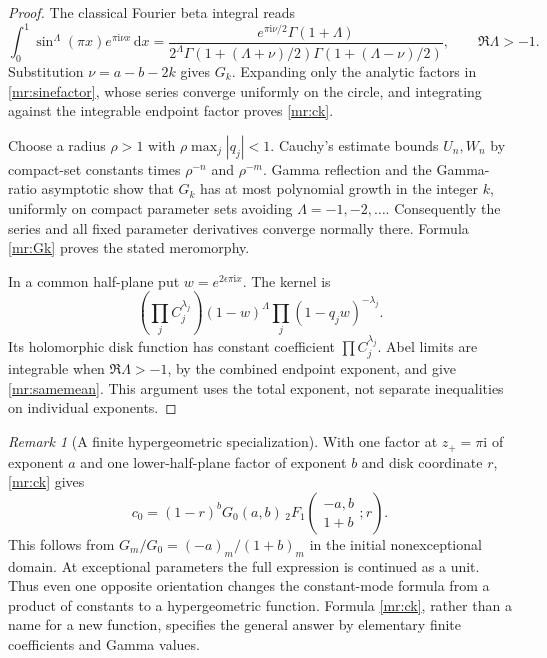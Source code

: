 \documentclass[11pt]{article}
\numberwithin{equation}{section}
\theoremstyle{plain}
\theoremstyle{definition}
\theoremstyle{remark}
\newtheorem{remark}[theorem]{Remark}
\newcommand{\ii}{\mathrm i}
\newcommand{\dd}{\,\mathrm d}
\begin{document}
\begin{proof}
The classical Fourier beta integral \cite[Eq.~5.12.6]{dlmf:beta} reads
\[
 \int_0^1\sin^\Lambda(\pi x)e^{\pi\ii\nu x}\dd x
  =\frac{e^{\pi\ii\nu/2}\Gamma(1+\Lambda)}
         {2^\Lambda\Gamma(1+(\Lambda+\nu)/2)
                         \Gamma(1+(\Lambda-\nu)/2)},\qquad
 \Re\Lambda>-1.
\]
Substitution $\nu=a-b-2k$ gives $G_k$. Expanding only the analytic
factors in \eqref{mr:sinefactor}, whose series converge uniformly on
the circle, and integrating against the integrable endpoint factor
proves \eqref{mr:ck}.

Choose a radius $\rho>1$ with $\rho\max_j|q_j|<1$. Cauchy's
estimate bounds $U_n,W_n$ by compact-set constants times $\rho^{-n}$
and $\rho^{-m}$. Gamma reflection and the Gamma-ratio asymptotic show
that $G_k$ has at most polynomial growth in the integer $k$, uniformly
on compact parameter sets avoiding $\Lambda=-1,-2,\ldots$.
Consequently the series and all fixed parameter derivatives converge
normally there. Formula \eqref{mr:Gk} proves the stated meromorphy.

In a common half-plane put $w=e^{2\epsilon\pi\ii x}$. The kernel is
\[
 \left(\prod_jC_j^{\lambda_j}\right)
       (1-w)^\Lambda\prod_j(1-q_jw)^{-\lambda_j}.
\]
Its holomorphic disk function has constant coefficient $\prod C_j^{\lambda_j}$.
Abel limits are integrable when $\Re\Lambda>-1$, by the combined
endpoint exponent, and give \eqref{mr:samemean}. This argument uses
the total exponent, not separate inequalities on individual exponents.
\end{proof}

\begin{remark}[A finite hypergeometric specialization]
With one factor at $z_+=\pi\ii$ of exponent $a$ and one lower-half-plane
factor of exponent $b$ and disk coordinate $r$, \eqref{mr:ck} gives
\begin{equation}\label{mr:gaussmean}
 c_0=(1-r)^bG_0(a,b)\,
       {}_2F_1\left(\begin{matrix}-a,b\\1+b\end{matrix};r\right).
\end{equation}
This follows from $G_m/G_0=(-a)_m/(1+b)_m$ in the initial
nonexceptional domain. At exceptional parameters the full expression is
continued as a unit. Thus even one opposite orientation changes the
constant-mode formula from a product of constants to a hypergeometric
function. Formula \eqref{mr:ck}, rather than a name for a new function,
specifies the general answer by elementary finite coefficients and Gamma
values.
\end{remark}
\end{document}
